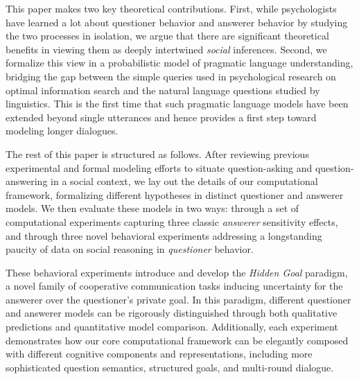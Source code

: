 \documentclass[12pt, floatsintext, jou]{apa6}
\begin{document}
This paper makes two key theoretical contributions. First, while psychologists have learned a lot about questioner behavior and answerer behavior by studying the two processes in isolation, we argue that there are significant theoretical benefits in viewing them as deeply intertwined \emph{social} inferences. Second, we formalize this view in a probabilistic model of pragmatic language understanding, bridging the gap between the simple queries used in psychological research on optimal information search and the natural language questions studied by linguistics. 
This is the first time that such pragmatic language models have been extended beyond single utterances and hence provides a first step toward modeling longer dialogues.
%

The rest of this paper is structured as follows. 
After reviewing previous experimental and formal modeling efforts to situate question-asking and question-answering in a social context, we lay out the details of our computational framework, formalizing different hypotheses in distinct questioner and answerer models. 
We then evaluate these models in two ways: through a set of computational experiments capturing three classic \emph{answerer} sensitivity effects, and through three novel behavioral experiments addressing a longstanding paucity of data on social reasoning in \emph{questioner} behavior. 

These behavioral experiments introduce and develop the \emph{Hidden Goal} paradigm, a novel family of cooperative communication tasks inducing uncertainty for the answerer over the questioner's private goal. 
In this paradigm, different questioner and answerer models can be rigorously distinguished through both qualitative predictions and quantitative model comparison. 
Additionally, each experiment demonstrates how our core computational framework can be elegantly composed with different cognitive components and representations, including more sophisticated question semantics, structured goals, and multi-round dialogue. 

\end{document}
